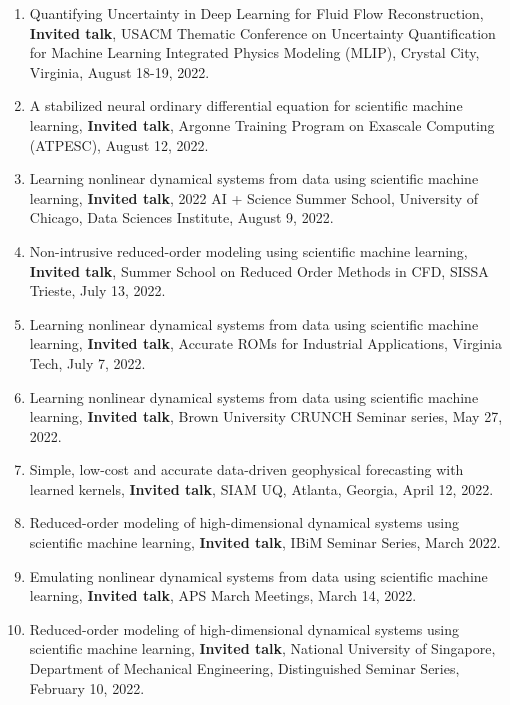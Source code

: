 \documentclass[letterpaper]{article}
\begin{document}
\begin{enumerate}
\item Quantifying Uncertainty in Deep Learning for Fluid Flow Reconstruction, \textbf{Invited talk}, USACM Thematic Conference on Uncertainty Quantification for Machine Learning Integrated Physics Modeling (MLIP), Crystal City, Virginia, August 18-19, 2022.

\item A stabilized neural ordinary differential equation for scientific machine learning, \textbf{Invited talk}, Argonne Training Program on Exascale Computing (ATPESC), August 12, 2022.

\item Learning nonlinear dynamical systems from data using scientific machine learning, \textbf{Invited talk}, 2022 AI + Science Summer School, University of Chicago, Data Sciences Institute, August 9, 2022.

\item Non-intrusive reduced-order modeling using scientific machine learning, \textbf{Invited talk}, Summer School on Reduced Order Methods in CFD, SISSA Trieste, July 13, 2022.

\item Learning nonlinear dynamical systems from data using scientific machine learning, \textbf{Invited talk}, Accurate ROMs for Industrial Applications, Virginia Tech, July 7, 2022.

\item Learning nonlinear dynamical systems from data using scientific machine learning, \textbf{Invited talk}, Brown University CRUNCH Seminar series, May 27, 2022. 

\item Simple, low-cost and accurate data-driven geophysical forecasting with learned kernels, \textbf{Invited talk}, SIAM UQ, Atlanta, Georgia, April 12, 2022.

\item Reduced-order modeling of high-dimensional dynamical systems using scientific machine learning, \textbf{Invited talk}, IBiM Seminar Series, March 2022.

\item Emulating nonlinear dynamical systems from data using scientific machine learning, \textbf{Invited talk}, APS March Meetings, March 14, 2022.

\item Reduced-order modeling of high-dimensional dynamical systems using scientific machine learning, \textbf{Invited talk}, National University of Singapore, Department of Mechanical Engineering, Distinguished Seminar Series, February 10, 2022.


\end{enumerate}
\end{document}
